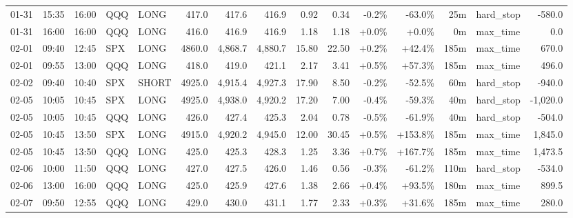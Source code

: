 \documentclass[11pt,a4paper,twoside]{article}
\begin{document}
\begin{landscape}
\begin{center}
\begin{longtable}{>{\color{txtmain}}l l l l l r r r r r r r r >{\color{txtmain}}l r}
01-31 & 15:35 & 16:00 & QQQ & LONG & 417.0 & 417.6 & 416.9 & 0.92 & 0.34 & \textcolor{lossred}{-0.2\%} & \textcolor{lossred}{-63.0\%} & 25m & hard\_stop & \textcolor{lossred}{-580.0} \\
01-31 & 16:00 & 16:00 & QQQ & LONG & 416.0 & 416.9 & 416.9 & 1.18 & 1.18 & \textcolor{wingreen}{+0.0\%} & \textcolor{wingreen}{+0.0\%} & 0m & max\_time & \textcolor{wingreen}{0.0} \\
02-01 & 09:40 & 12:45 & SPX & LONG & 4860.0 & 4,868.7 & 4,880.7 & 15.80 & 22.50 & \textcolor{wingreen}{+0.2\%} & \textcolor{wingreen}{+42.4\%} & 185m & max\_time & \textcolor{wingreen}{670.0} \\
02-01 & 09:55 & 13:00 & QQQ & LONG & 418.0 & 419.0 & 421.1 & 2.17 & 3.41 & \textcolor{wingreen}{+0.5\%} & \textcolor{wingreen}{+57.3\%} & 185m & max\_time & \textcolor{wingreen}{496.0} \\
02-02 & 09:40 & 10:40 & SPX & SHORT & 4925.0 & 4,915.4 & 4,927.3 & 17.90 & 8.50 & \textcolor{lossred}{-0.2\%} & \textcolor{lossred}{-52.5\%} & 60m & hard\_stop & \textcolor{lossred}{-940.0} \\
02-05 & 10:05 & 10:45 & SPX & LONG & 4925.0 & 4,938.0 & 4,920.2 & 17.20 & 7.00 & \textcolor{lossred}{-0.4\%} & \textcolor{lossred}{-59.3\%} & 40m & hard\_stop & \textcolor{lossred}{-1,020.0} \\
02-05 & 10:05 & 10:45 & QQQ & LONG & 426.0 & 427.4 & 425.3 & 2.04 & 0.78 & \textcolor{lossred}{-0.5\%} & \textcolor{lossred}{-61.9\%} & 40m & hard\_stop & \textcolor{lossred}{-504.0} \\
02-05 & 10:45 & 13:50 & SPX & LONG & 4915.0 & 4,920.2 & 4,945.0 & 12.00 & 30.45 & \textcolor{wingreen}{+0.5\%} & \textcolor{wingreen}{+153.8\%} & 185m & max\_time & \textcolor{wingreen}{1,845.0} \\
02-05 & 10:45 & 13:50 & QQQ & LONG & 425.0 & 425.3 & 428.3 & 1.25 & 3.36 & \textcolor{wingreen}{+0.7\%} & \textcolor{wingreen}{+167.7\%} & 185m & max\_time & \textcolor{wingreen}{1,473.5} \\
02-06 & 10:00 & 11:50 & QQQ & LONG & 427.0 & 427.5 & 426.0 & 1.46 & 0.56 & \textcolor{lossred}{-0.3\%} & \textcolor{lossred}{-61.2\%} & 110m & hard\_stop & \textcolor{lossred}{-534.0} \\
02-06 & 13:00 & 16:00 & QQQ & LONG & 425.0 & 425.9 & 427.6 & 1.38 & 2.66 & \textcolor{wingreen}{+0.4\%} & \textcolor{wingreen}{+93.5\%} & 180m & max\_time & \textcolor{wingreen}{899.5} \\
02-07 & 09:50 & 12:55 & QQQ & LONG & 429.0 & 430.0 & 431.1 & 1.77 & 2.33 & \textcolor{wingreen}{+0.3\%} & \textcolor{wingreen}{+31.6\%} & 185m & max\_time & \textcolor{wingreen}{280.0} \\

\end{longtable}
\end{center}
\end{landscape}
\end{document}
